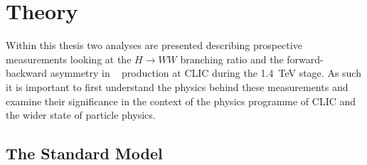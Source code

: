 \chapter{Theory}
\label{theory}

Within this thesis two analyses are presented describing prospective measurements looking at the $H\rightarrow WW$ branching ratio and the forward-backward asymmetry in \ttbar~ production at CLIC during the 1.4~TeV stage. As such it is important to first understand the physics behind these measurements and examine their significance in the context of the physics programme of CLIC and the wider state of particle physics.


\section{The Standard Model}


